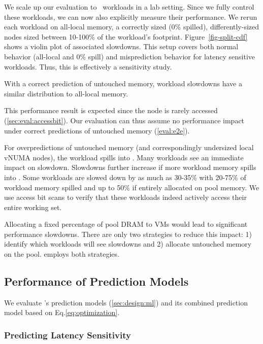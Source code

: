 We scale up our evaluation to \numTotalApps\ workloads in a lab setting.
Since we fully control these workloads, we can now also explicitly measure their performance.
We rerun each workload on all-local memory, a correctly sized \cvn (0\% spilled), differently-sized \cvn nodes sized between 10-100\% of the workload's footprint.
Figure~\ref{fig-split-cdf} shows a violin plot of associated slowdowns.
This setup covers both normal behavior (all-local and 0\% spill) and misprediction behavior for latency sensitive workloads.
Thus, this is effectively a sensitivity study.

\myfinding{}
%
With a correct prediction of untouched memory, workload slowdowns have a similar distribution to all-local memory.

This performance result is expected since the \cvn node is rarely accessed (\sec\ref{sec:eval:accessbit}).
Our evaluation can thus assume no performance impact under correct predictions of untouched memory (\sec\ref{eval:e2e}).

\myfinding{}
%
For overpredictions of untouched memory (and correspondingly undersized local vNUMA nodes), the workload spills into \cvn.
Many workloads see an immediate impact on slowdown.
Slowdowns further increase if more workload memory spills into \cvn.
Some workloads are slowed down by as much as 30-35\% with 20-75\% of workload memory spilled and up to 50\% if entirely allocated on pool memory.
We use access bit scans to verify that these workloads indeed actively access their entire working set.

Allocating a fixed percentage of pool DRAM to VMs would lead to significant performance slowdowns.
There are only two strategies to reduce this impact: 1) identify which workloads will see slowdowns and 2) allocate untouched memory on the pool.
\sys employs both strategies.



\subsection{Performance of Prediction Models}
\label{sec:eval:models}

We evaluate \sys's prediction models (\sec\ref{sec:design:ml}) and its combined prediction model based on Eq.\eqref{eq:optimization}.

\vfive\subsubsection{Predicting Latency Sensitivity}
%
\label{sec-eval-pred}

